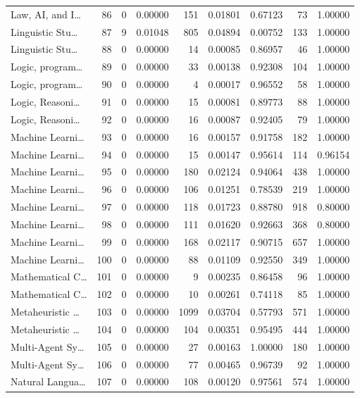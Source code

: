 \begin{table}
\begin{tabular}{lrrrrrrrr}
Law, AI, and I… & 86 & 0 & 0.00000 & 151 & 0.01801 & 0.67123 & 73 & 1.00000 \\
Linguistic Stu… & 87 & 9 & 0.01048 & 805 & 0.04894 & 0.00752 & 133 & 1.00000 \\
Linguistic Stu… & 88 & 0 & 0.00000 & 14 & 0.00085 & 0.86957 & 46 & 1.00000 \\
Logic, program… & 89 & 0 & 0.00000 & 33 & 0.00138 & 0.92308 & 104 & 1.00000 \\
Logic, program… & 90 & 0 & 0.00000 & 4 & 0.00017 & 0.96552 & 58 & 1.00000 \\
Logic, Reasoni… & 91 & 0 & 0.00000 & 15 & 0.00081 & 0.89773 & 88 & 1.00000 \\
Logic, Reasoni… & 92 & 0 & 0.00000 & 16 & 0.00087 & 0.92405 & 79 & 1.00000 \\
Machine Learni… & 93 & 0 & 0.00000 & 16 & 0.00157 & 0.91758 & 182 & 1.00000 \\
Machine Learni… & 94 & 0 & 0.00000 & 15 & 0.00147 & 0.95614 & 114 & 0.96154 \\
Machine Learni… & 95 & 0 & 0.00000 & 180 & 0.02124 & 0.94064 & 438 & 1.00000 \\
Machine Learni… & 96 & 0 & 0.00000 & 106 & 0.01251 & 0.78539 & 219 & 1.00000 \\
Machine Learni… & 97 & 0 & 0.00000 & 118 & 0.01723 & 0.88780 & 918 & 0.80000 \\
Machine Learni… & 98 & 0 & 0.00000 & 111 & 0.01620 & 0.92663 & 368 & 0.80000 \\
Machine Learni… & 99 & 0 & 0.00000 & 168 & 0.02117 & 0.90715 & 657 & 1.00000 \\
Machine Learni… & 100 & 0 & 0.00000 & 88 & 0.01109 & 0.92550 & 349 & 1.00000 \\
Mathematical C… & 101 & 0 & 0.00000 & 9 & 0.00235 & 0.86458 & 96 & 1.00000 \\
Mathematical C… & 102 & 0 & 0.00000 & 10 & 0.00261 & 0.74118 & 85 & 1.00000 \\
Metaheuristic … & 103 & 0 & 0.00000 & 1099 & 0.03704 & 0.57793 & 571 & 1.00000 \\
Metaheuristic … & 104 & 0 & 0.00000 & 104 & 0.00351 & 0.95495 & 444 & 1.00000 \\
Multi-Agent Sy… & 105 & 0 & 0.00000 & 27 & 0.00163 & 1.00000 & 180 & 1.00000 \\
Multi-Agent Sy… & 106 & 0 & 0.00000 & 77 & 0.00465 & 0.96739 & 92 & 1.00000 \\
Natural Langua… & 107 & 0 & 0.00000 & 108 & 0.00120 & 0.97561 & 574 & 1.00000 \\

\end{tabular}
\end{table}
